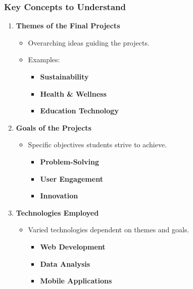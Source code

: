 \documentclass[aspectratio=169]{beamer}
\begin{document}
\begin{frame}[fragile]
    \frametitle{Key Concepts to Understand}
    \begin{enumerate}
        \item \textbf{Themes of the Final Projects}
        \begin{itemize}
            \item Overarching ideas guiding the projects.
            \item Examples:
            \begin{itemize}
                \item \textbf{Sustainability}
                \item \textbf{Health \& Wellness}
                \item \textbf{Education Technology}
            \end{itemize}
        \end{itemize}
        
        \item \textbf{Goals of the Projects}
        \begin{itemize}
            \item Specific objectives students strive to achieve.
            \begin{itemize}
                \item \textbf{Problem-Solving}
                \item \textbf{User Engagement}
                \item \textbf{Innovation}
            \end{itemize}
        \end{itemize}
        
        \item \textbf{Technologies Employed}
        \begin{itemize}
            \item Varied technologies dependent on themes and goals.
            \begin{itemize}
                \item \textbf{Web Development}
                \item \textbf{Data Analysis}
                \item \textbf{Mobile Applications}
            \end{itemize}
        \end{itemize}
    \end{enumerate}
\end{frame}
\end{document}
